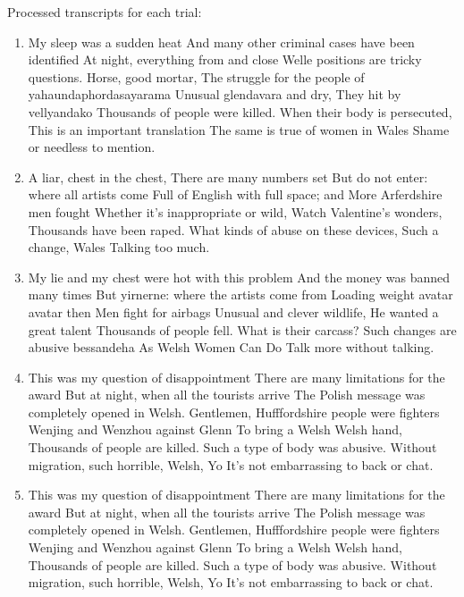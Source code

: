 \documentclass{article}
\begin{document}
Processed transcripts for each trial:

\begin{enumerate}
\item 
My sleep was a sudden heat
And many other criminal cases have been identified
At night, everything from and close
Welle positions are tricky questions.
Horse, good mortar,
The struggle for the people of yahaundaphordasayarama
Unusual glendavara and dry,
They hit by vellyandako
Thousands of people were killed.
When their body is persecuted,
This is an important translation
The same is true of women in Wales
Shame or needless to mention.


\item 
A liar, chest in the chest,
There are many numbers set
But do not enter: where all artists come
Full of English with full space;
and
More Arferdshire men fought
Whether it's inappropriate or wild,
Watch Valentine's wonders,
Thousands have been raped.
What kinds of abuse on these devices,
Such a change,
Wales
Talking too much.


\item 
My lie and my chest were hot with this problem
And the money was banned many times
But yirnerne: where the artists come from
Loading weight avatar avatar
then
Men fight for airbags
Unusual and clever wildlife,
He wanted a great talent
Thousands of people fell.
What is their carcass?
Such changes are abusive bessandeha
As Welsh Women Can Do
Talk more without talking.


\item 
This was my question of disappointment
There are many limitations for the award
But at night, when all the tourists arrive
The Polish message was completely opened in Welsh.
Gentlemen,
Hufffordshire people were fighters
Wenjing and Wenzhou against Glenn
To bring a Welsh Welsh hand,
Thousands of people are killed.
Such a type of body was abusive.
Without migration, such horrible,
Welsh, Yo
It's not embarrassing to back or chat.


\item 
This was my question of disappointment
There are many limitations for the award
But at night, when all the tourists arrive
The Polish message was completely opened in Welsh.
Gentlemen,
Hufffordshire people were fighters
Wenjing and Wenzhou against Glenn
To bring a Welsh Welsh hand,
Thousands of people are killed.
Such a type of body was abusive.
Without migration, such horrible,
Welsh, Yo
It's not embarrassing to back or chat.

\end{enumerate}
\end{document}
